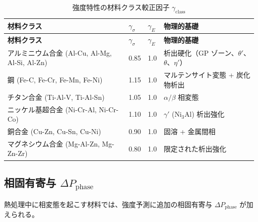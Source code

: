 \documentclass[11pt,a4paper]{article}
\theoremstyle{remark}
\begin{document}
	\begin{longtable}{p{3.5cm}p{2.5cm}p{2.5cm}p{5cm}}
		\caption{強度特性の材料クラス較正因子 \(\gamma_{\text{class}}\)} \label{tab:material-class-factors} \\
		\toprule
		\textbf{材料クラス} & \(\gamma_{\sigma}\) & \(\gamma_{E}\) & \textbf{物理的基礎} \\
		\midrule
		\endfirsthead
		\toprule
		\textbf{材料クラス} & \(\gamma_{\sigma}\) & \(\gamma_{E}\) & \textbf{物理的基礎} \\
		\midrule
		\endhead
		アルミニウム合金 (Al-Cu, Al-Mg, Al-Si, Al-Zn) & 0.85 & 1.0 & 析出硬化（GP ゾーン、\(\theta'\)、\(\theta\)、\(\eta'\)） \\
		鋼 (Fe-C, Fe-Cr, Fe-Mn, Fe-Ni) & 1.15 & 1.0 & マルテンサイト変態 + 炭化物析出 \\
		チタン合金 (Ti-Al-V, Ti-Al-Sn) & 1.05 & 1.0 & \(\alpha/\beta\) 相変態 \\
		ニッケル基超合金 (Ni-Cr-Al, Ni-Cr-Co) & 1.10 & 1.0 & \(\gamma'\) (Ni\(_3\)Al) 析出強化 \\
		銅合金 (Cu-Zn, Cu-Sn, Cu-Ni) & 0.90 & 1.0 & 固溶 + 金属間相 \\
		マグネシウム合金 (Mg-Al-Zn, Mg-Zn-Zr) & 0.80 & 1.0 & 限定された析出強化 \\
		\bottomrule
	\end{longtable}
	
	\subsection{相固有寄与 \(\Delta P_{\text{phase}}\)}
	\label{subsec:phase-contributions}
	
	熱処理中に相変態を起こす材料では、強度予測に追加の相固有寄与 \(\Delta P_{\text{phase}}\) が加えられる。
	
\end{document}
